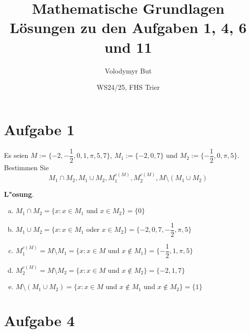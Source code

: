 \documentclass[10pt, a4paper, oneside]{article}
\title{Mathematische Grundlagen\\[5pt]Lösungen zu den Aufgaben 1, 4, 6 und 11}
\author{Volodymyr But}
\date{WS24/25, FHS Trier}
\begin{document}
\maketitle
\vspace{25px}

\section{Aufgabe 1}

Es seien $M := \{ -2, -\dfrac{1}{2}, 0,1, \pi, 5,7 \}$, $M_1 := \{-2, 0, 7\}$ und
$M_2 := \{ -\dfrac{1}{2}, 0, \pi, 5 \}$. Bestimmen Sie $$M_1 \cap M_2, M_1 \cup
M_2, M_1^{c(M)}, M_2^{c(M)}, M \setminus (M_1 \cup M_2)$$

\textbf{L"osung}.

\begin{enumerate}[(a)]
    \item $M_1 \cap M_2 = \{ x : x \in M_1$ und $x \in M_2 \} = \{ 0 \}$
    \item $M_1 \cup M_2 = \{ x : x \in M_1$ oder $x \in M_2 \} = \{ -2, 0, 7, -\dfrac{1}{2}, \pi, 5 \}$
    \item $M_1^{c(M)} = M \setminus M_1 = \{ x : x \in M$ und $x \notin M_1 \} = \{ -\dfrac{1}{2}, 1, \pi, 5 \}$
    \item $M_2^{c(M)} = M \setminus M_2 = \{ x : x \in M$ und $x \notin M_2 \} = \{ -2, 1, 7 \}$
    \item $M \setminus (M_1 \cup M_2) = \{ x : x \in M$ und $x \notin M_1$ und $x \notin M_2\} = \{1\}$
\end{enumerate}

\section{Aufgabe 4}
\end{document}

